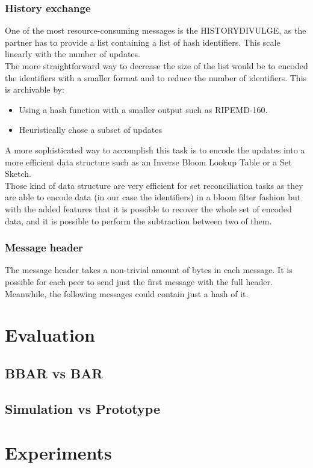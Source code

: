 \documentclass[mscthesis]{usiinfthesis}
\begin{document}
\subsection{History exchange}
One of the most resource-consuming messages is the HISTORYDIVULGE, as the partner has to provide a list containing a list of hash identifiers. This scale linearly with the number of updates. \\
The more straightforward way to decrease the size of the list would be to encoded the identifiers with a smaller format and to reduce the number of identifiers. This is archivable by:
\begin{itemize}
	\item Using a hash function with a smaller output such as RIPEMD-160.
	\item Heuristically chose a subset of updates
\end{itemize}
A more sophisticated way to accomplish this task is to encode the updates into a more efficient data structure such as an Inverse Bloom Lookup Table or a Set Sketch. \\
Those kind of data structure are very efficient for set reconciliation tasks as they are able to encode data (in our case the identifiers) in a bloom filter fashion but with the added features that it is possible to recover the whole set of encoded data, and it is possible to perform the subtraction between two of them.

\subsection{Message header}
The message header takes a non-trivial amount of bytes in each message. It is possible for each peer to send just the first message with the full header.\\ Meanwhile, the following messages could contain just a hash of it.

\chapter{Evaluation}
\section{BBAR vs BAR}
\section{Simulation vs Prototype}

\chapter{Experiments}
\end{document}
